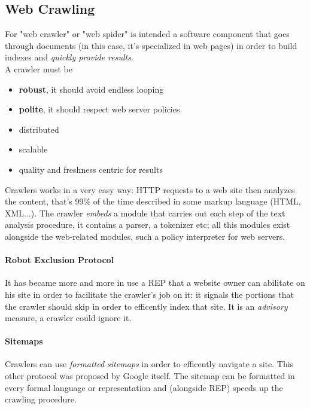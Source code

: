 \documentclass{article}
\begin{document}
		\subsection{Web Crawling}
			For "web crawler" or "web spider" is intended a software component that goes through documents (in this case, it's specialized in web pages) in order to build indexes and \textit{quickly provide results}.\\
			A crawler must be
			\begin{itemize}
				\item \textbf{robust}, it should avoid endless looping
				\item \textbf{polite}, it should respect web server policies
				\item distributed
				\item scalable
				\item quality and freshness centric for results				
			\end{itemize}
			Crawlers works in a very easy way: HTTP requests to a web site then analyzes the content, that's 99\% of the time described in some markup language (HTML, XML...). The crawler \textit{embeds} a module that carries out each step of the text analysis procedure, it contains a parser, a tokenizer etc; all this modules exist alongside the web-related modules, such a policy interpreter for web servers.

			\paragraph{Robot Exclusion Protocol}
				It has became more and more in use a REP that a website owner can abilitate on his site in order to facilitate the crawler's job on it: it signals the portions that the crawler should skip in order to efficently index that site. It is an \textit{advisory} measure, a crawler could ignore it.

			\paragraph{Sitemaps}
				Crawlers can use \textit{formatted sitemaps} in order to efficently navigate a site. This other protocol was proposed by Google itself. The sitemap can be formatted in every formal language or representation and (alongside REP) speeds up the crawling procedure.
\end{document}
